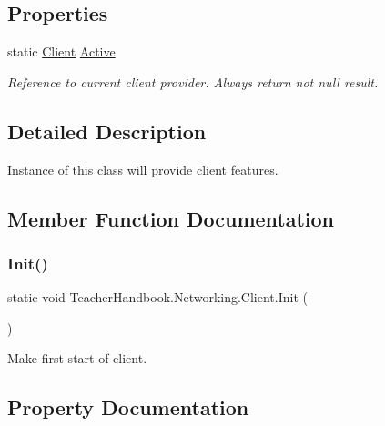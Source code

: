 \subsection*{Properties}
\begin{DoxyCompactItemize}
\item 
static \mbox{\hyperlink{class_teacher_handbook_1_1_networking_1_1_client}{Client}} \mbox{\hyperlink{class_teacher_handbook_1_1_networking_1_1_client_a426f783c455abac0bd658c7b290e0066}{Active}}
\begin{DoxyCompactList}\small\item\em Reference to current client provider. Always return not null result. \end{DoxyCompactList}\end{DoxyCompactItemize}


\subsection{Detailed Description}
Instance of this class will provide client features. 



\subsection{Member Function Documentation}
\mbox{\label{class_teacher_handbook_1_1_networking_1_1_client_ad37de86191b6dae582e338c57182bace}} 
\subsubsection{\texorpdfstring{Init()}{Init()}}
{\footnotesize\ttfamily static void Teacher\+Handbook.\+Networking.\+Client.\+Init (\begin{DoxyParamCaption}{ }\end{DoxyParamCaption})\hspace{0.3cm}{\ttfamily [static]}}



Make first start of client. 



\subsection{Property Documentation}
\mbox{\label{class_teacher_handbook_1_1_networking_1_1_client_a426f783c455abac0bd658c7b290e0066}} 
